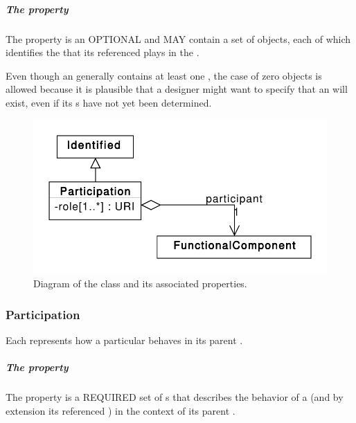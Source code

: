 \subparagraph{The  property}\label{sec:participations}

The  property is an OPTIONAL and MAY contain a set of  objects, each of which identifies the  that its referenced  plays in the .

Even though an  generally contains at least one , the case of zero  objects is allowed because it is plausible that a designer might want to specify that an  will exist, even if its s have not yet been determined.

\begin{figure}[ht]
\begin{center}
\includegraphics[scale=0.6]{uml/participation}
\caption[]{Diagram of the  class and its associated properties.}
\label{uml:participation}
\end{center}
\end{figure}

\subsubsection{Participation}
\label{sec:Participation}

Each  represents how a particular  behaves in its parent
.

\subparagraph{The  property}\label{sec:roles:P}

The  property is a REQUIRED set of s that describes the behavior of a  (and by extension its referenced ) in the context of its parent .

